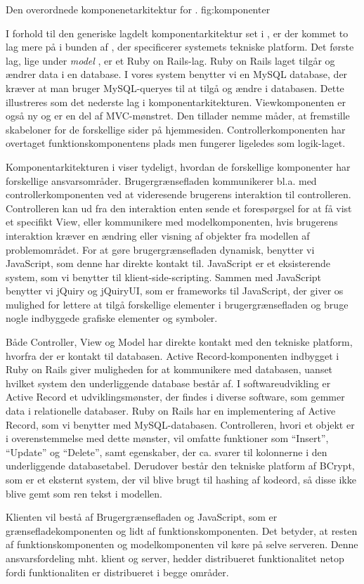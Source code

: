 	{Den overordnede komponenetarkitektur for \Foodl{}.}
	{fig:komponenter}

I forhold til den generiske lagdelt komponentarkitektur set i , er der kommet to lag mere på i bunden af , der specificerer systemets tekniske platform. Det første lag, lige under \textit{model} , er et Ruby on Rails-lag. Ruby on Rails laget tilgår og ændrer data i en database. I vores system benytter vi en MySQL database, der kræver at man bruger MySQL-queryes til at tilgå og ændre i databasen. Dette illustreres som det nederste lag i komponentarkitekturen. Viewkomponenten er også ny og er en del af MVC-mønstret. Den tillader nemme måder, at fremstille skabeloner for de forskellige sider på hjemmesiden. Controllerkomponenten har overtaget funktionskomponentens plads men fungerer ligeledes som logik-laget.

Komponentarkitekturen i  viser tydeligt, hvordan de forskellige komponenter har forskellige ansvarsområder. Brugergrænsefladen kommunikerer bl.a. med controllerkomponenten ved at videresende brugerens interaktion til controlleren. Controlleren kan ud fra den interaktion enten sende et forespørgsel for at få vist et specifikt View, eller kommunikere med modelkomponenten, hvis brugerens interaktion kræver en ændring eller visning af objekter fra modellen af problemområdet. For at gøre brugergrænsefladen dynamisk, benytter vi JavaScript, som denne har direkte kontakt til. JavaScript er et eksisterende system, som vi benytter til klient-side-scripting. Sammen med JavaScript benytter vi jQuiry og jQuiryUI, som er frameworks til JavaScript, der giver os mulighed for lettere at tilgå forskellige elementer i brugergrænsefladen og bruge nogle indbyggede grafiske elementer og symboler.

Både Controller, View og Model har direkte kontakt med den tekniske platform, hvorfra der er kontakt til databasen. Active Record-komponenten indbygget i Ruby on Rails giver muligheden for at kommunikere med databasen, uanset hvilket system den underliggende database består af. I softwareudvikling er Active Record et udviklingsmønster, der findes i diverse software, som gemmer data i relationelle databaser. Ruby on Rails har en implementering af Active Record, som vi benytter med MySQL-databasen. Controlleren, hvori et objekt er i overenstemmelse med dette mønster, vil omfatte funktioner som ``Insert'', ``Update'' og ``Delete'', samt egenskaber, der ca. svarer til kolonnerne i den underliggende databasetabel.\cite{activerecordwiki} Derudover består den tekniske platform af BCrypt, som er et eksternt system, der vil blive brugt til hashing af kodeord, så disse ikke blive gemt som ren tekst i modellen.

Klienten vil bestå af Brugergrænsefladen og JavaScript, som er grænsefladekomponenten og lidt af funktionskomponenten. Det betyder, at resten af funktionskomponenten og modelkomponenten vil køre på selve serveren. Denne ansvarsfordeling mht. klient og server, hedder distribueret funktionalitet netop fordi funktionaliten er distribueret i begge områder.
